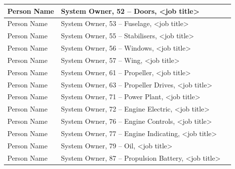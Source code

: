 \begin{table}[h]
\begin{tabular}{|p{1.5in}|p{3.5in}|p{1.5in}|}
Person Name & System Owner, 52 -- Doors, \textless job title\textgreater & \\[1.2cm] \hline
Person Name & System Owner, 53 -- Fuselage, \textless job title\textgreater & \\[1.2cm] \hline
Person Name & System Owner, 55 -- Stabilisers, \textless job title\textgreater & \\[1.2cm] \hline
Person Name & System Owner, 56 -- Windows, \textless job title\textgreater & \\[1.2cm] \hline
Person Name & System Owner, 57 -- Wing, \textless job title\textgreater & \\[1.2cm] \hline

Person Name & System Owner, 61 -- Propeller, \textless job title\textgreater & \\[1.2cm] \hline
Person Name & System Owner, 63 -- Propeller Drives, \textless job title\textgreater & \\[1.2cm] \hline
Person Name & System Owner, 71 -- Power Plant, \textless job title\textgreater & \\[1.2cm] \hline
Person Name & System Owner, 72 -- Engine Electric, \textless job title\textgreater & \\[1.2cm] \hline
Person Name & System Owner, 76 -- Engine Controls, \textless job title\textgreater & \\[1.2cm] \hline
Person Name & System Owner, 77 -- Engine Indicating, \textless job title\textgreater & \\[1.2cm] \hline
Person Name & System Owner, 79 -- Oil, \textless job title\textgreater & \\[1.2cm] \hline
Person Name & System Owner, 87 -- Propulsion Battery, \textless job title\textgreater & \\[1.2cm] \hline

\end{tabular}
\end{table}
